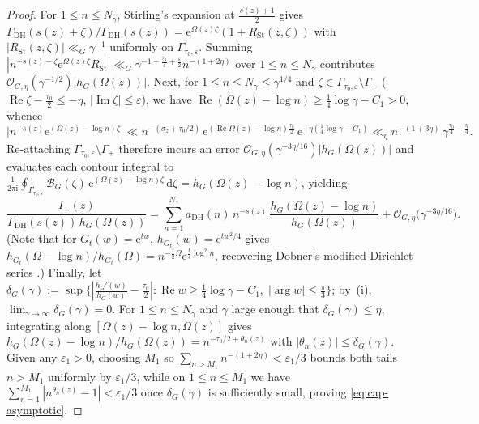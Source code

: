 \documentclass[11pt,a4paper,reqno]{amsart}
\theoremstyle{definition}
\theoremstyle{remark}
\numberwithin{equation}{section}
\newcommand{\dd}{\mathrm{d}}
\newcommand{\ii}{\mathrm{i}}
\newcommand{\ee}{\mathrm{e}}
\DeclareMathOperator{\Reop}{Re}
\DeclareMathOperator{\Imop}{Im}
\begin{document}
\begin{proof}
For $1 \le n \le N_\gamma$, Stirling's expansion at $\frac{s(z)+1}{2}$ gives $\Gamma_{\mathrm{DH}}(s(z)+\zeta)/\Gamma_{\mathrm{DH}}(s(z)) = \ee^{\Omega(z)\zeta}(1 + R_{\mathrm{St}}(z,\zeta))$ with $|R_{\mathrm{St}}(z,\zeta)| \ll_G \gamma^{-1}$ uniformly on $\Gamma_{\tau_0,\varepsilon}$. Summing $|n^{-s(z)-\zeta}\ee^{\Omega(z)\zeta} R_{\mathrm{St}}| \ll_G \gamma^{-1 + \frac{\tau_0}{4} + \frac{\varepsilon}{2}} n^{-(1 + 2\eta)}$ over $1 \le n \le N_\gamma$ contributes $\mathcal{O}_{G,\eta}(\gamma^{-1/2})|h_G(\Omega(z))|$. Next, for $1 \le n \le N_\gamma \le \gamma^{1/4}$ and $\zeta \in \Gamma_{\tau_0,\varepsilon} \setminus \Gamma_+$ ($\Reop\zeta - \frac{\tau_0}{2} \le -\eta$, $|\Imop\zeta| \le \varepsilon$), we have $\Reop(\Omega(z) - \log n) \ge \frac{1}{4}\log\gamma - C_1 > 0$, whence
\begin{equation*}
  \bigl|n^{-s(z)}\ee^{(\Omega(z)-\log n)\zeta}\bigr|
  \ll n^{-(\sigma_z + \tau_0/2)}\,\ee^{(\Reop\Omega(z)-\log n)\frac{\tau_0}{2}}\,\ee^{-\eta(\frac{1}{4}\log\gamma - C_1)}
  \ll_\eta n^{-(1 + 3\eta)}\,\gamma^{\frac{\tau_0}{4} - \frac{\eta}{4}}.
\end{equation*}
Re-attaching $\Gamma_{\tau_0,\varepsilon} \setminus \Gamma_+$ therefore incurs an error $\mathcal{O}_{G,\eta}(\gamma^{-3\eta/16})|h_G(\Omega(z))|$ and evaluates each contour integral to $\frac{1}{2\pi\ii}\oint_{\Gamma_{\tau_0,\varepsilon}}\mathcal{B}_G(\zeta)\,\ee^{(\Omega(z)-\log n)\zeta}\,\dd\zeta = h_G(\Omega(z) - \log n)$, yielding
\begin{equation}
  \frac{I_+(z)}{\Gamma_{\mathrm{DH}}(s(z))\,h_G(\Omega(z))}
  = \sum_{n=1}^{N_\gamma} a_{\mathrm{DH}}(n)\,n^{-s(z)}\,\frac{h_G(\Omega(z) - \log n)}{h_G(\Omega(z))} + \mathcal{O}_{G,\eta}\bigl(\gamma^{-3\eta/16}\bigr).
  \label{eq:dobner-generalized}
\end{equation}
(Note that for $G_t(w) = \ee^{tw}$, $h_{G_t}(w) = \ee^{tw^2/4}$ gives $h_{G_t}(\Omega - \log n)/h_{G_t}(\Omega) = n^{-\frac{t}{2}\Omega}\ee^{\frac{t}{4}\log^2 n}$, recovering Dobner's modified Dirichlet series \cite{dobner2021}.) Finally, let $\delta_G(\gamma) := \sup\{|\frac{h_G'(w)}{h_G(w)} - \frac{\tau_0}{2}| : \Reop w \ge \frac{1}{4}\log\gamma - C_1,\; |\arg w| \le \frac{\pi}{3}\}$; by~(i), $\lim_{\gamma\to\infty}\delta_G(\gamma) = 0$. For $1 \le n \le N_\gamma$ and $\gamma$ large enough that $\delta_G(\gamma) \le \eta$, integrating along $[\Omega(z)-\log n, \Omega(z)]$ gives $h_G(\Omega(z)-\log n)/h_G(\Omega(z)) = n^{-\tau_0/2 + \theta_n(z)}$ with $|\theta_n(z)| \le \delta_G(\gamma)$. Given any $\varepsilon_1 > 0$, choosing $M_1$ so $\sum_{n > M_1} n^{-(1+2\eta)} < \varepsilon_1/3$ bounds both tails $n > M_1$ uniformly by $\varepsilon_1/3$, while on $1 \le n \le M_1$ we have $\sum_{n=1}^{M_1}|n^{\theta_n(z)} - 1| < \varepsilon_1/3$ once $\delta_G(\gamma)$ is sufficiently small, proving \eqref{eq:cap-asymptotic}.
\end{proof}
\end{document}
